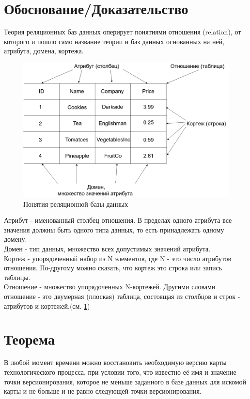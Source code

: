 \section*{Обоснование/Доказательство}
\indent Теория реляционных баз данных оперирует понятиями отношения (relation), от которого и пошло само название теории и баз данных основанных на ней, атрибута, домена, кортежа.

\begin{figure}[ht]
	\centering
	\includegraphics[width=\linewidth]{pics/databaseExample.png}
	\caption{Понятия реляционной базы данных}
	\label{fig:dbExample}
\end{figure}

\indent Атрибут - именованный столбец отношения.
В пределах одного атрибута все значения должны быть одного типа данных, то есть принадлежать одному домену.\\
\indent Домен - тип данных, множество всех допустимых значений атрибута.\\
\indent Кортеж - упорядоченный набор из N элементов, где N - это число атрибутов отношения.
По-другому можно сказать, что кортеж это строка или запись таблицы.\\
\indent Отношение - множество упорядоченных N-кортежей.
Другими словами отношение - это двумерная (плоская) таблица, состоящая из столбцов и строк - атрибутов и кортежей.(см. \ref{fig:dbExample})\\


\section{Теорема}
\begin{theorem}
	\label{th:th1}
	В любой момент времени можно восстановить необходимую версию карты технологического процесса, при условии того, что известно её имя и значение точки версионирования, которое не меньше заданного в базе данных для искомой карты и не больше и не равно следующей точки версионирования.
\end{theorem}

